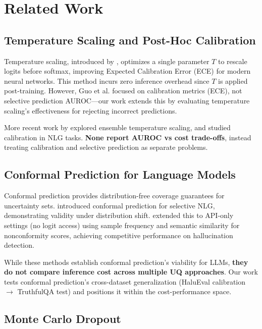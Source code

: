 \section{Related Work}

\subsection{Temperature Scaling and Post-Hoc Calibration}

Temperature scaling, introduced by \cite{guo2017calibration}, optimizes a single parameter $T$ to rescale logits before softmax, improving Expected Calibration Error (ECE) for modern neural networks. This method incurs zero inference overhead since $T$ is applied post-training. However, Guo et al. focused on calibration metrics (ECE), not selective prediction AUROC---our work extends this by evaluating temperature scaling's effectiveness for rejecting incorrect predictions.

More recent work by \cite{nixon2019ensemble} explored ensemble temperature scaling, and \cite{desai2020calibration} studied calibration in NLG tasks. \textbf{None report AUROC vs cost trade-offs}, instead treating calibration and selective prediction as separate problems.

\subsection{Conformal Prediction for Language Models}

Conformal prediction provides distribution-free coverage guarantees for uncertainty sets. \cite{kumar2023conformal} introduced conformal prediction for selective NLG, demonstrating validity under distribution shift. \cite{su2024conformal} extended this to API-only settings (no logit access) using sample frequency and semantic similarity for nonconformity scores, achieving competitive performance on hallucination detection.

While these methods establish conformal prediction's viability for LLMs, \textbf{they do not compare inference cost across multiple UQ approaches}. Our work tests conformal prediction's cross-dataset generalization (HaluEval calibration $\rightarrow$ TruthfulQA test) and positions it within the cost-performance space.

\subsection{Monte Carlo Dropout}

